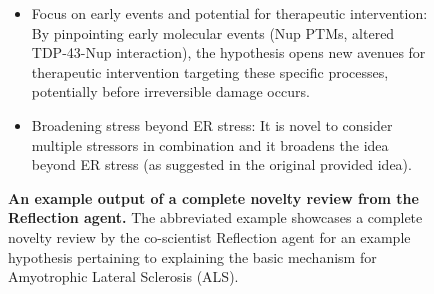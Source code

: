 \begin{figure}[htbp!]
\begin{tcolorbox}
\begin{itemize}
    \item Focus on early events and potential for therapeutic intervention: By pinpointing early molecular events (Nup PTMs, altered TDP-43-Nup interaction), the hypothesis opens new avenues for therapeutic intervention targeting these specific processes, potentially before irreversible damage occurs.
    \item Broadening stress beyond ER stress: It is novel to consider multiple stressors in combination and it broadens the idea beyond ER stress (as suggested in the original provided idea).
\end{itemize}
\end{tcolorbox}
\vspace{0.1cm}
\caption{\textbf{An example output of a complete novelty review from the Reflection agent.} The abbreviated example showcases a complete novelty review by the co-scientist Reflection agent for an example hypothesis pertaining to explaining the basic mechanism for Amyotrophic Lateral Sclerosis (ALS).}
\label{fig:ex_reflection_novelty}
\end{figure}


